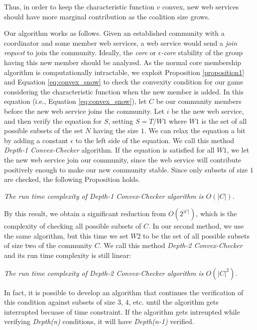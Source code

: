 \documentclass[10pt,journal,cspaper,compsoc]{IEEEtran}
\begin{document}
Thus, in order to keep the characteristic function $v$ convex, new
web services should have more marginal contribution as the
coalition size grows.

Our algorithm works as follows. Given an established community
with a coordinator and some member web services, a web service would
send a \emph{join request} to join  the community. Ideally, the
\emph{core} or \emph{$\epsilon$-core} stability of the group
having this new member should be analyzed. As the normal core
membership algorithm is computationally intractable, we exploit
Proposition \ref{proposition1} and Equation \ref{eq:convex_snow}
to check the convexity condition for our game considering the characteristic function 
when the new member is added. In this equation (i.e., Equation
\ref{eq:convex_snow}), let $C$ be our community members before the
new web service joins the community. Let  ${i}$ be the new web
service, and then verify the equation for $S$, setting $ S = T /
W1 $ where $W1$ is the set of all possible subsets of the set $N$
having the size $1$. We can relax the equation a bit by adding a
constant $\epsilon$ to the left side of the equation. We call this
method \emph{Depth-1 Convex-Checker} algorithm. If the equation is
satisfied for all $W1$, we let the new web service join our
community, since the web service will contribute positively enough
to make our new community stable. Since only subsets of size $1$
are checked, the following Proposition holds.

\begin{theorem}\label{complexity1}
\emph{The run time complexity of Depth-1 Convex-Checker algorithm
is $O(|C|)$.}
\end{theorem}

By this result, we obtain a significant reduction from
$O(2^{|C|})$, which is the complexity of checking all possible
subsets of $C$. In our second method, we use the same algorithm,
but this time we set $W2$ to be the set of all possible subsets of
size two of the community $C$. We call this method \emph{Depth-2
Convex-Checker} and its run time complexity is still linear:

\begin{theorem}\label{complexity2}
\emph{The run time complexity of Depth-2 Convex-Checker algorithm
is $O(|C|^2)$.}
\end{theorem}

In fact, it is possible to develop an algorithm that continues the
verification of this condition against subsets of size $3$, $4$,
etc. until the algorithm gets interrupted becuase of time constraint. If the algorithm gets intreupted while verifying \emph{Depth(n)} conditions, it will have \emph{Depth(n-1)} verified.
\end{document}
